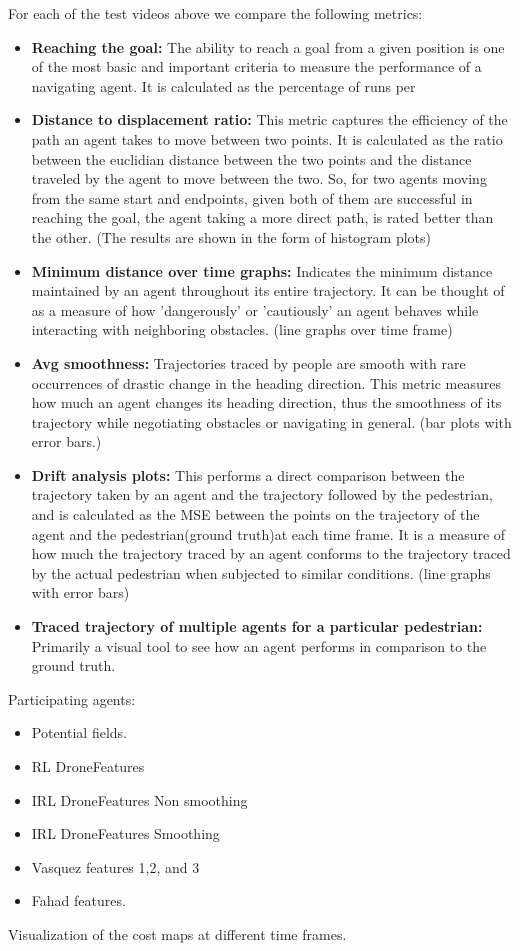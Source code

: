 For each of the test videos above we compare the following metrics:
\begin{itemize}
        \item \textbf{Reaching the goal:} The ability to reach a goal from a given position is one of the most basic and important criteria to measure the performance of a navigating agent. It is calculated as the percentage of runs per 
        \item \textbf{Distance to displacement ratio:} This metric captures the efficiency of the path an agent takes to move between two points. It is calculated as the ratio between the euclidian distance between the two points and the distance traveled by the agent to move between the two. So, for two agents moving from the same start and endpoints, given both of them are successful in reaching the goal, the agent taking a more direct path, is rated better than the other. (The results are shown in the form of histogram plots)
        \item \textbf{Minimum distance over time graphs:} Indicates the minimum distance maintained by an agent throughout its entire trajectory. It can be thought of as a measure of how 'dangerously' or 'cautiously' an agent behaves while interacting with neighboring obstacles. (line graphs over time frame)
        \item \textbf{Avg smoothness:} Trajectories traced by people are smooth with rare occurrences of drastic change in the heading direction. This metric measures how much an agent changes its heading direction, thus the smoothness of its trajectory while negotiating obstacles or navigating in general. (bar plots with error bars.)
        \item \textbf{Drift analysis plots: }This performs a direct comparison between the trajectory taken by an agent and the trajectory followed by the pedestrian, and is calculated as the MSE between the points on the trajectory of the agent and the pedestrian(ground truth)at each time frame. It is a measure of how much the trajectory traced by an agent conforms to the trajectory traced by the actual pedestrian when subjected to similar conditions. (line graphs with error bars)
        \item \textbf{Traced trajectory of multiple agents for a particular pedestrian:} Primarily a visual tool to see how an agent performs in comparison to the ground truth.
\end{itemize}
Participating agents:
\begin{itemize}
        \item Potential fields.
        \item RL DroneFeatures
        \item IRL DroneFeatures Non smoothing
        \item IRL DroneFeatures Smoothing
        \item Vasquez features 1,2, and 3
        \item Fahad features.
\end{itemize}
Visualization of the cost maps at different time frames.
